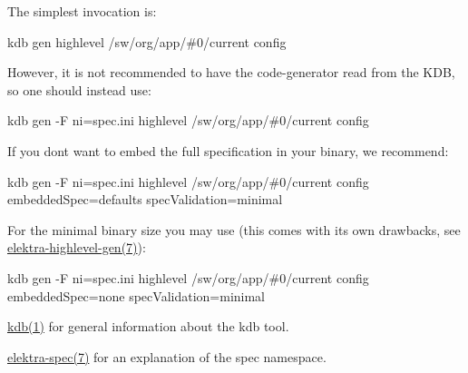 The simplest invocation is\+:

{\ttfamily kdb gen highlevel /sw/org/app/\#0/current config}

However, it is not recommended to have the code-\/generator read from the K\+DB, so one should instead use\+:

{\ttfamily kdb gen -\/F ni=spec.\+ini highlevel /sw/org/app/\#0/current config}

If you don\textquotesingle{}t want to embed the full specification in your binary, we recommend\+:

{\ttfamily kdb gen -\/F ni=spec.\+ini highlevel /sw/org/app/\#0/current config embedded\+Spec=defaults spec\+Validation=minimal}

For the minimal binary size you may use (this comes with its own drawbacks, see \mbox{\hyperlink{doc_help_elektra-highlevel-gen_md}{elektra-\/highlevel-\/gen(7)}})\+:

{\ttfamily kdb gen -\/F ni=spec.\+ini highlevel /sw/org/app/\#0/current config embedded\+Spec=none spec\+Validation=minimal}


\begin{DoxyItemize}
\item \mbox{\hyperlink{doc_help_kdb_md}{kdb(1)}} for general information about the {\ttfamily kdb} tool.
\item \mbox{\hyperlink{doc_help_elektra-spec_md}{elektra-\/spec(7)}} for an explanation of the {\ttfamily spec} namespace. 
\end{DoxyItemize}